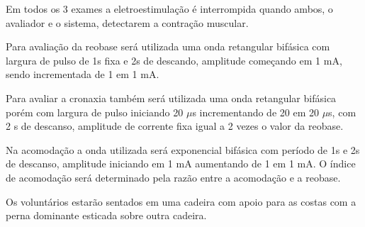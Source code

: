 \documentclass[a4paper,10pt]{article}
\begin{document}
Em todos os 3 exames a eletroestimulação é interrompida quando ambos, o avaliador e o sistema, detectarem a contração muscular.

Para avaliação da reobase será utilizada uma onda retangular bifásica com largura de pulso de 1s fixa e 2s de descando, amplitude começando em 1 mA, sendo incrementada de 1 em 1 mA.

Para avaliar a cronaxia também será utilizada uma onda retangular bifásica porém com largura de pulso iniciando 20 $\mu$s incrementando de 20 em 20 $\mu$s, com 2 s de descanso, amplitude de corrente fixa igual a 2 vezes o valor da reobase.

Na acomodação a onda utilizada será exponencial bifásica com período de 1s e 2s de descanso, amplitude iniciando em 1 mA aumentando de 1 em 1 mA.
O índice de acomodação será determinado pela razão entre a acomodação e a reobase.

Os voluntários estarão sentados em uma cadeira com apoio para as costas com a perna dominante esticada sobre outra cadeira.
\end{document}

